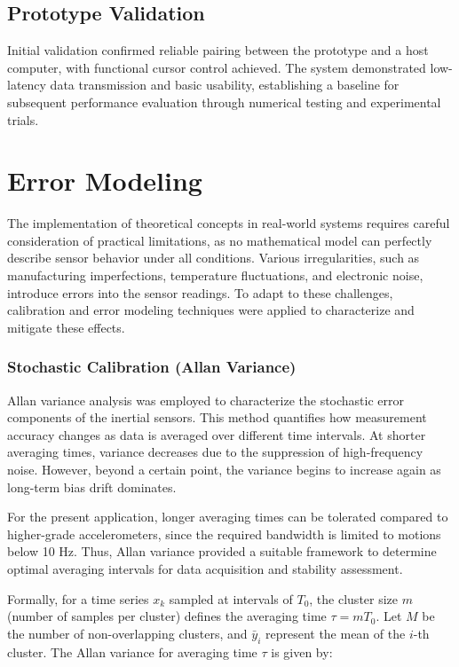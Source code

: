 \documentclass[10pt]{article}
\begin{document}
\subsection*{Prototype Validation}
Initial validation confirmed reliable pairing between the prototype and a host 
computer, with functional cursor control achieved. The system demonstrated 
low-latency data transmission and basic usability, establishing a baseline for 
subsequent performance evaluation through numerical testing and experimental 
trials.





\section*{Error Modeling}

The implementation of theoretical concepts in real-world systems requires careful 
consideration of practical limitations, as no mathematical model can perfectly 
describe sensor behavior under all conditions. Various irregularities, such as 
manufacturing imperfections, temperature fluctuations, and electronic noise, 
introduce errors into the sensor readings. To adapt to these challenges, 
calibration and error modeling techniques were applied to characterize and 
mitigate these effects.

\subsubsection*{Stochastic Calibration (Allan Variance)}
Allan variance analysis was employed to characterize the stochastic error 
components of the inertial sensors. This method quantifies how measurement 
accuracy changes as data is averaged over different time intervals. At shorter 
averaging times, variance decreases due to the suppression of high-frequency 
noise. However, beyond a certain point, the variance begins to increase again as 
long-term bias drift dominates.  

For the present application, longer averaging times can be tolerated compared to 
higher-grade accelerometers, since the required bandwidth is limited to motions 
below 10 Hz. Thus, Allan variance provided a suitable framework to determine 
optimal averaging intervals for data acquisition and stability assessment.

Formally, for a time series $x_k$ sampled at intervals of $T_0$, the cluster 
size $m$ (number of samples per cluster) defines the averaging time $\tau = mT_0$. Let $M$ 
be the number of non-overlapping clusters, and $\bar{y}_i$ represent the mean of 
the $i$-th cluster. The Allan variance for averaging time $\tau$ is given by:
\end{document}
